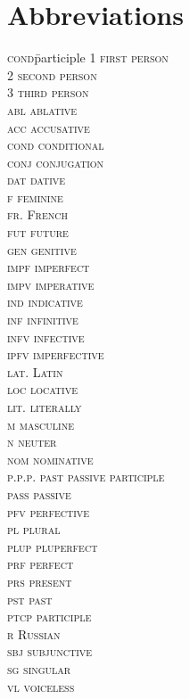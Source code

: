 \documentclass[output=paper, colorlinks,citecolor=brown]{langsci/langscibook}
\begin{document}
\section*{Abbreviations}
\begin{multicols}{2}
\begin{tabbing}
\textsc{cond}\hspace{1em}\= participle\kill
\scshape 1  \> first person\\
\scshape 2  \> second person\\
\scshape 3  \> third person\\
\scshape abl  \> ablative\\
\scshape acc  \> accusative\\
\scshape cond  \> conditional\\
\scshape conj  \> conjugation\\
\scshape dat  \> dative\\
\scshape f  \> feminine\\
\scshape fr.  \> French\\
\scshape fut  \> future\\
\scshape gen  \> genitive\\
\scshape impf  \> imperfect\\
\scshape impv  \> imperative\\
\scshape ind  \> indicative\\
\scshape inf  \> infinitive\\
\scshape infv  \> infective\\
\scshape ipfv  \> imperfective\\
\scshape lat.  \> Latin\\
\scshape loc  \> locative\\
\scshape lit.  \> literally\\
\scshape m  \> masculine\\
\scshape n  \> neuter\\
\scshape nom  \> nominative\\
\scshape p.p.p.  \> past passive participle\\
\scshape pass  \> passive\\
\scshape pfv  \> perfective\\
\scshape pl  \> plural\\
\scshape plup  \> pluperfect\\
\scshape prf  \> perfect\\
\scshape prs  \> present\\
\scshape pst  \> past\\
\scshape ptcp  \> participle\\
\scshape r  \> Russian\\
\scshape sbj  \> subjunctive\\
\scshape sg  \> singular\\
\scshape vl  \> voiceless
\end{tabbing}
\end{multicols}

{\sloppy\printbibliography[heading=subbibliography,notkeyword=this]}
\end{document}
